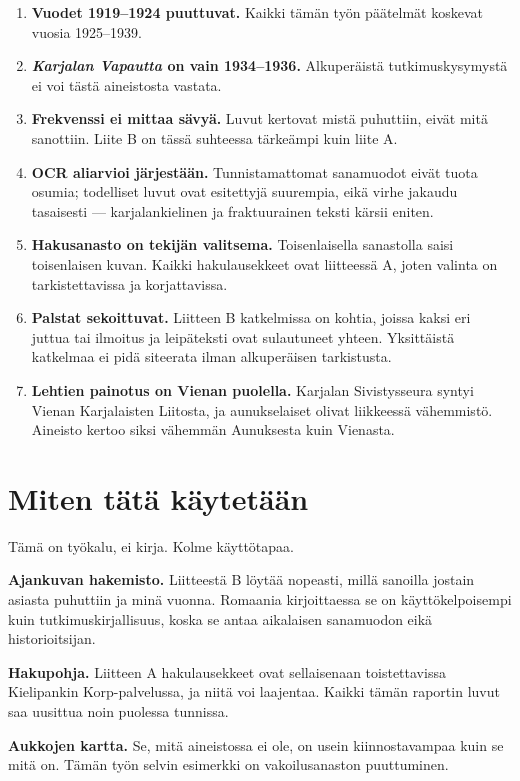 \documentclass[10pt,a4paper]{article}
\begin{document}
\begin{enumerate}[leftmargin=1.4em,itemsep=0.35em]
\item \textbf{Vuodet 1919--1924 puuttuvat.} Kaikki tämän työn päätelmät koskevat
vuosia 1925--1939.
\item \textbf{\emph{Karjalan Vapautta} on vain 1934--1936.} Alkuperäistä
tutkimuskysymystä ei voi tästä aineistosta vastata.
\item \textbf{Frekvenssi ei mittaa sävyä.} Luvut kertovat mistä puhuttiin, eivät mitä
sanottiin. Liite B on tässä suhteessa tärkeämpi kuin liite A.
\item \textbf{OCR aliarvioi järjestään.} Tunnistamattomat sanamuodot eivät tuota
osumia; todelliset luvut ovat esitettyjä suurempia, eikä virhe jakaudu tasaisesti ---
karjalankielinen ja fraktuurainen teksti kärsii eniten.
\item \textbf{Hakusanasto on tekijän valitsema.} Toisenlaisella sanastolla saisi
toisenlaisen kuvan. Kaikki hakulausekkeet ovat liitteessä A, joten valinta on
tarkistettavissa ja korjattavissa.
\item \textbf{Palstat sekoittuvat.} Liitteen B katkelmissa on kohtia, joissa kaksi eri
juttua tai ilmoitus ja leipäteksti ovat sulautuneet yhteen. Yksittäistä katkelmaa ei
pidä siteerata ilman alkuperäisen tarkistusta.
\item \textbf{Lehtien painotus on Vienan puolella.} Karjalan Sivistysseura syntyi
Vienan Karjalaisten Liitosta, ja aunukselaiset olivat liikkeessä vähemmistö. Aineisto
kertoo siksi vähemmän Aunuksesta kuin Vienasta.
\end{enumerate}

\section{Miten tätä käytetään}

Tämä on työkalu, ei kirja. Kolme käyttötapaa.

\textbf{Ajankuvan hakemisto.} Liitteestä B löytää nopeasti, millä sanoilla jostain
asiasta puhuttiin ja minä vuonna. Romaania kirjoittaessa se on käyttökelpoisempi kuin
tutkimuskirjallisuus, koska se antaa aikalaisen sanamuodon eikä historioitsijan.

\textbf{Hakupohja.} Liitteen A hakulausekkeet ovat sellaisenaan toistettavissa
Kielipankin Korp-palvelussa, ja niitä voi laajentaa. Kaikki tämän raportin luvut
saa uusittua noin puolessa tunnissa.

\textbf{Aukkojen kartta.} Se, mitä aineistossa ei ole, on usein kiinnostavampaa kuin
se mitä on. Tämän työn selvin esimerkki on vakoilusanaston puuttuminen.
\end{document}
